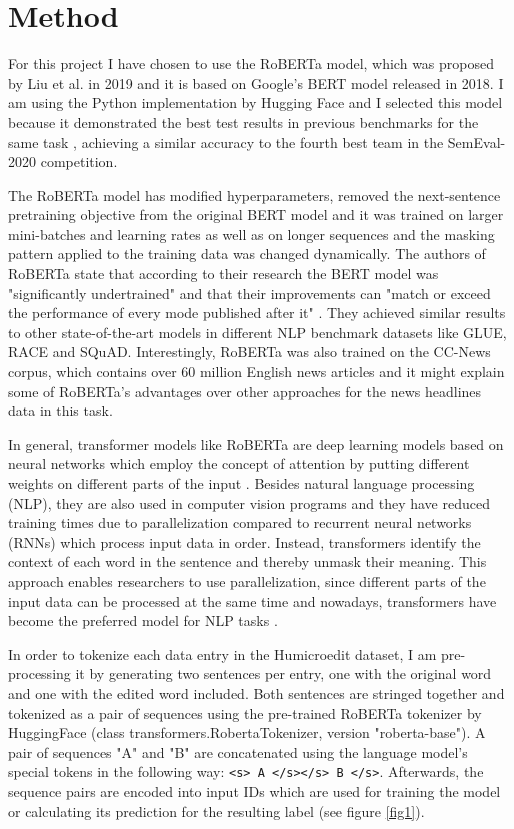 \documentclass[11pt,a4paper,onecolumn,oneside,notitlepage]{article}
\begin{document}
    \section{Method}
    For this project I have chosen to use the RoBERTa model, which was proposed by Liu et al. in 2019 \citep{DBLP:journals/corr/abs-1907-11692} and it is based on Google's BERT model released in 2018. I am using the Python implementation by Hugging Face \citep{wolf-etal-2020-transformers} and I selected this model because it demonstrated the best test results in previous benchmarks for the same task \citep{DBLP:journals/corr/abs-2008-00304}, achieving a similar accuracy to the fourth best team in the SemEval-2020 competition.

    The RoBERTa model has modified hyperparameters, removed the next-sentence pretraining objective from the original BERT model and it was trained on larger mini-batches and learning rates as well as on longer sequences and the masking pattern applied to the training data was changed dynamically. The authors of RoBERTa state that according to their research the BERT model was "significantly undertrained" and that their improvements can "match or exceed the performance of every mode published after it" \citep{DBLP:journals/corr/abs-1907-11692}. They achieved similar results to other state-of-the-art models in different NLP benchmark datasets like GLUE, RACE and SQuAD. Interestingly, RoBERTa was also trained on the CC-News corpus, which contains over 60 million English news articles and it might explain some of RoBERTa's advantages over other approaches for the news headlines data in this task.

    In general, transformer models like RoBERTa are deep learning models based on neural networks which employ the concept of attention by putting different weights on different parts of the input \citep{DBLP:journals/corr/VaswaniSPUJGKP17}. Besides natural language processing (NLP), they are also used in computer vision programs and they have reduced training times due to parallelization compared to recurrent neural networks (RNNs) which process input data in order. Instead, transformers identify the context of each word in the sentence and thereby unmask their meaning. This approach enables researchers to use parallelization, since different parts of the input data can be processed at the same time and nowadays, transformers have become the preferred model for NLP tasks \citep{wolf-etal-2020-transformers}.

    In order to tokenize each data entry in the Humicroedit dataset, I am pre-processing it by generating two sentences per entry, one with the original word and one with the edited word included. Both sentences are stringed together and tokenized as a pair of sequences using the pre-trained RoBERTa tokenizer by HuggingFace (class transformers.RobertaTokenizer, version "roberta-base"). A pair of sequences "A" and "B" are concatenated using the language model's special tokens in the following way: \verb|<s> A </s></s> B </s>|. Afterwards, the sequence pairs are encoded into input IDs which are used for training the model or calculating its prediction for the resulting label (see figure \ref{fig1}).
\end{document}
